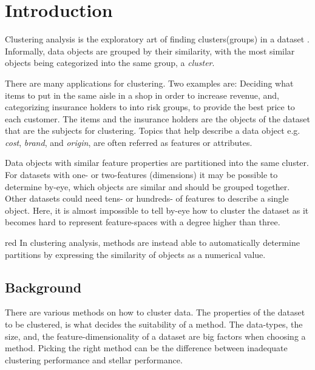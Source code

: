 \documentclass[../report.tex]{subfiles}
\begin{document}
\chapter{Introduction}
Clustering analysis is the exploratory art of finding clusters(groups) in a dataset \cite{Kaufman1990}. Informally, data objects are grouped by their similarity, with the most similar objects being categorized into the same group, a \textit{cluster}.

There are many applications for clustering. Two examples are: Deciding what items to put in the same aisle in a shop in order to increase revenue, and, categorizing insurance holders to into risk groups, to provide the best price to each customer. The items and the insurance holders are the objects of the dataset that are the subjects for clustering. Topics that help describe a data object e.g. \textit{cost}, \textit{brand}, and \textit{origin}, are often referred as features or attributes.

Data objects with similar feature properties are partitioned into the same cluster. For datasets with one- or two-features (dimensions) it may be possible to determine by-eye, which objects are similar and should be grouped together. Other datasets could need tens- or hundreds- of features to describe a single object. Here, it is almost impossible to tell by-eye how to cluster the dataset as it becomes hard to represent feature-spaces with a degree higher than three.

\begin{color}{red}
In clustering analysis, methods are instead able to automatically determine partitions by expressing the similarity of objects as a numerical value.
\end{color}

\section{Background}

There are various methods on how to cluster data. The properties of the dataset to be clustered, is what decides the suitability of a method.
The data-types, the size, and, the feature-dimensionality of a dataset are big factors when choosing a method. Picking the right method can be the difference between inadequate clustering performance and stellar performance.
\end{document}
